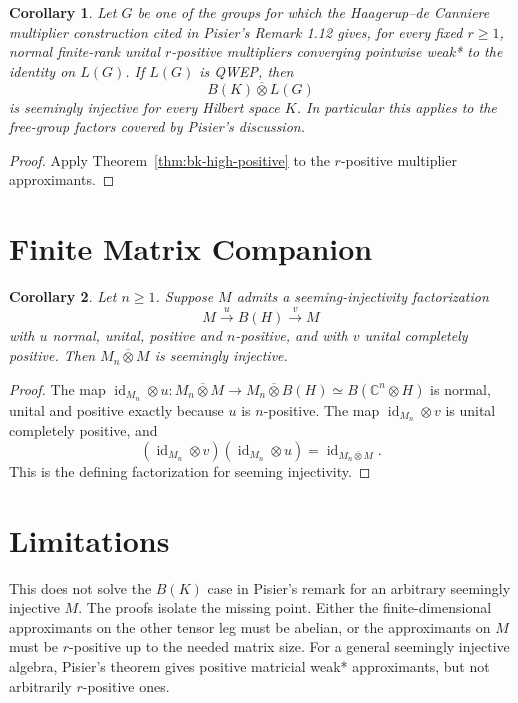 \documentclass[11pt]{article}
\newtheorem{corollary}{Corollary}
\newcommand{\otv}{\mathbin{\overline{\otimes}}}
\newcommand{\id}{\operatorname{id}}
\begin{document}
\begin{corollary}
Let \(G\) be one of the groups for which the Haagerup--de Canniere multiplier
construction cited in Pisier's Remark 1.12 gives, for every fixed
\(r\geq 1\), normal finite-rank unital \(r\)-positive multipliers converging
pointwise weak* to the identity on \(L(G)\). If \(L(G)\) is QWEP, then
\[
  B(K)\otv L(G)
\]
is seemingly injective for every Hilbert space \(K\). In particular this
applies to the free-group factors covered by Pisier's discussion.
\end{corollary}

\begin{proof}
Apply Theorem~\ref{thm:bk-high-positive} to the \(r\)-positive multiplier
approximants.
\end{proof}

\section*{Finite Matrix Companion}

\begin{corollary}
Let \(n\geq 1\). Suppose \(M\) admits a seeming-injectivity factorization
\[
  M \xrightarrow{u} B(H) \xrightarrow{v} M
\]
with \(u\) normal, unital, positive and \(n\)-positive, and with \(v\) unital
completely positive. Then \(M_n\otv M\) is seemingly injective.
\end{corollary}

\begin{proof}
The map \(\id_{M_n}\otimes u:M_n\otv M\to M_n\otv B(H)\simeq
B(\mathbb C^n\otimes H)\) is normal, unital and positive exactly because
\(u\) is \(n\)-positive. The map \(\id_{M_n}\otimes v\) is unital completely
positive, and
\[
  (\id_{M_n}\otimes v)(\id_{M_n}\otimes u)
  =\id_{M_n\otv M}.
\]
This is the defining factorization for seeming injectivity.
\end{proof}

\section*{Limitations}

This does not solve the \(B(K)\) case in Pisier's remark for an arbitrary
seemingly injective \(M\). The proofs isolate the missing point. Either the
finite-dimensional approximants on the other tensor leg must be abelian, or
the approximants on \(M\) must be \(r\)-positive up to the needed matrix size.
For a general seemingly injective algebra, Pisier's theorem gives positive
matricial weak* approximants, but not arbitrarily \(r\)-positive ones.
\end{document}
